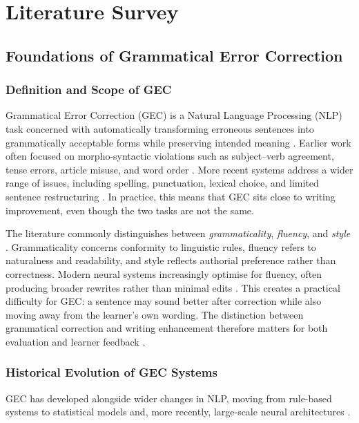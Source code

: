 \chapter{Literature Survey}

\section{Foundations of Grammatical Error Correction}

\subsection{Definition and Scope of GEC}

Grammatical Error Correction (GEC) is a Natural Language Processing (NLP) task concerned with automatically transforming erroneous sentences into grammatically acceptable forms while preserving intended meaning \cite{ng-etal-2014-conll}. Earlier work often focused on morpho-syntactic violations such as subject--verb agreement, tense errors, article misuse, and word order \cite{bryant-etal-2017-automatic}. More recent systems address a wider range of issues, including spelling, punctuation, lexical choice, and limited sentence restructuring \cite{10.1162/coli_a_00478}. In practice, this means that GEC sits close to writing improvement, even though the two tasks are not the same.

The literature commonly distinguishes between \textit{grammaticality}, \textit{fluency}, and \textit{style} \cite{napoles-etal-2017-jfleg}. Grammaticality concerns conformity to linguistic rules, fluency refers to naturalness and readability, and style reflects authorial preference rather than correctness. Modern neural systems increasingly optimise for fluency, often producing broader rewrites rather than minimal edits \cite{loem2023exploringeffectivenessgpt3grammatical}. This creates a practical difficulty for GEC: a sentence may sound better after correction while also moving away from the learner's own wording. The distinction between grammatical correction and writing enhancement therefore matters for both evaluation and learner feedback \cite{ke2019automated}.

\subsection{Historical Evolution of GEC Systems}

GEC has developed alongside wider changes in NLP, moving from rule-based systems to statistical models and, more recently, large-scale neural architectures \cite{10.1162/coli_a_00478}.

